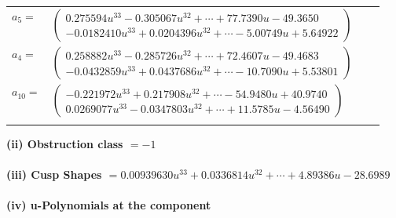\documentclass[1p]{elsarticle_modified}
\theoremstyle{definition}
\begin{document}
\begin{tabular}{m{7pt} m{180pt} m{7pt} m{180pt} }
\flushright $a_{5}=$&$\begin{pmatrix}0.275594 u^{33}-0.305067 u^{32}+\cdots+77.7390 u-49.3650\\-0.0182410 u^{33}+0.0204396 u^{32}+\cdots-5.00749 u+5.64922\end{pmatrix}$ \\
\flushright $a_{4}=$&$\begin{pmatrix}0.258882 u^{33}-0.285726 u^{32}+\cdots+72.4607 u-49.4683\\-0.0432859 u^{33}+0.0437686 u^{32}+\cdots-10.7090 u+5.53801\end{pmatrix}$ \\
\flushright $a_{10}=$&$\begin{pmatrix}-0.221972 u^{33}+0.217908 u^{32}+\cdots-54.9480 u+40.9740\\0.0269077 u^{33}-0.0347803 u^{32}+\cdots+11.5785 u-4.56490\end{pmatrix}$\\&\end{tabular}
\flushleft \textbf{(ii) Obstruction class $= -1$}\\~\\
\flushleft \textbf{(iii) Cusp Shapes $= 0.00939630 u^{33}+0.0336814 u^{32}+\cdots+4.89386 u-28.6989$}\\~\\
\newpage\renewcommand{\arraystretch}{1}
\flushleft \textbf{(iv) u-Polynomials at the component}\newline \\
\end{document}
